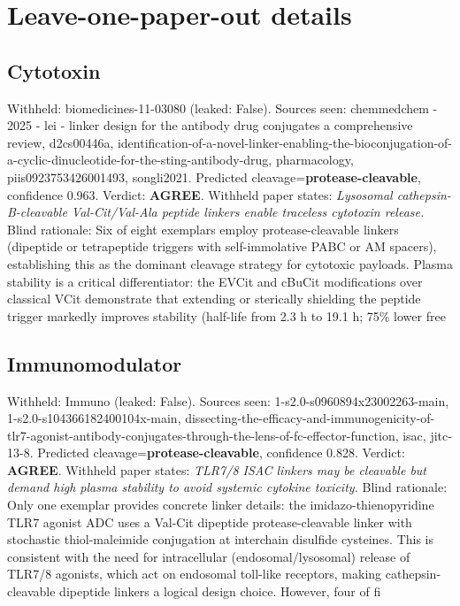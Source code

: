 \documentclass[10pt]{article}
\begin{document}
\section{Leave-one-paper-out details}
\subsection{Cytotoxin}
Withheld: biomedicines-11-03080 (leaked: False). Sources seen: chemmedchem - 2025 - lei - linker design for the antibody drug conjugates  a comprehensive review, d2cs00446a, identification-of-a-novel-linker-enabling-the-bioconjugation-of-a-cyclic-dinucleotide-for-the-sting-antibody-drug, pharmacology, piis0923753426001493, songli2021. Predicted cleavage=\textbf{protease-cleavable}, confidence 0.963. Verdict: \textbf{AGREE}. Withheld paper states: \emph{Lysosomal cathepsin-B-cleavable Val-Cit/Val-Ala peptide linkers enable traceless cytotoxin release.} Blind rationale: Six of eight exemplars employ protease-cleavable linkers (dipeptide or tetrapeptide triggers with self-immolative PABC or AM spacers), establishing this as the dominant cleavage strategy for cytotoxic payloads. Plasma stability is a critical differentiator: the EVCit and cBuCit modifications over classical VCit demonstrate that extending or sterically shielding the peptide trigger markedly improves stability (half-life from 2.3 h to 19.1 h; 75\% lower free 
\subsection{Immunomodulator}
Withheld: Immuno (leaked: False). Sources seen: 1-s2.0-s0960894x23002263-main, 1-s2.0-s104366182400104x-main, dissecting-the-efficacy-and-immunogenicity-of-tlr7-agonist-antibody-conjugates-through-the-lens-of-fc-effector-function, isac, jitc-13-8. Predicted cleavage=\textbf{protease-cleavable}, confidence 0.828. Verdict: \textbf{AGREE}. Withheld paper states: \emph{TLR7/8 ISAC linkers may be cleavable but demand high plasma stability to avoid systemic cytokine toxicity.} Blind rationale: Only one exemplar provides concrete linker details: the imidazo-thienopyridine TLR7 agonist ADC uses a Val-Cit dipeptide protease-cleavable linker with stochastic thiol-maleimide conjugation at interchain disulfide cysteines. This is consistent with the need for intracellular (endosomal/lysosomal) release of TLR7/8 agonists, which act on endosomal toll-like receptors, making cathepsin-cleavable dipeptide linkers a logical design choice. However, four of fi
\end{document}

